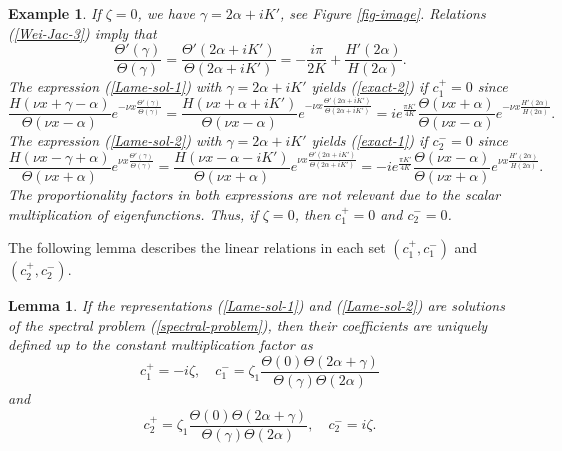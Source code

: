 \documentclass[12pt,reqno]{amsart}
\numberwithin{equation}{section}
\newtheorem{example}{Example}
\newtheorem{lemma}{Lemma}
\begin{document}
\begin{example}
If $\zeta = 0$, we have $\gamma = 2 \alpha + i K'$, see Figure \ref{fig-image}.
Relations (\ref{Wei-Jac-3}) imply that 
$$
\frac{\Theta'(\gamma)}{\Theta(\gamma)} = \frac{\Theta'(2 \alpha + i K')}{\Theta(2 \alpha + i K')} = -\frac{i \pi}{2K} + \frac{H'(2\alpha)}{H(2\alpha)}.
$$
The expression (\ref{Lame-sol-1}) with $\gamma = 2 \alpha + i K'$ yields (\ref{exact-2})  if $c_1^+ = 0$ since 
$$
\frac{H(\nu x + \gamma - \alpha)}{\Theta(\nu x - \alpha)} e^{-\nu x \frac{\Theta'(\gamma)}{\Theta(\gamma)}} = 
\frac{H(\nu x + \alpha + iK')}{\Theta(\nu x - \alpha)} e^{-\nu x \frac{\Theta'(2 \alpha + i K')}{\Theta(2 \alpha + i K')}} = 
i e^{\frac{\pi K'}{4 K}} \frac{\Theta(\nu x + \alpha)}{\Theta(\nu x - \alpha)}
e^{-\nu x \frac{H'(2\alpha)}{H(2\alpha)}}.
$$
The expression (\ref{Lame-sol-2}) with $\gamma = 2 \alpha + i K'$ yields (\ref{exact-1}) if $c_2^- = 0$ since 
$$
\frac{H(\nu x - \gamma + \alpha)}{\Theta(\nu x + \alpha)} e^{\nu x \frac{\Theta'(\gamma)}{\Theta(\gamma)}} = 
\frac{H(\nu x - \alpha - iK')}{\Theta(\nu x + \alpha)} e^{\nu x \frac{\Theta'(2 \alpha + i K')}{\Theta(2 \alpha + i K')}} = 
-i e^{\frac{\pi K'}{4 K}} \frac{\Theta(\nu x - \alpha)}{\Theta(\nu x + \alpha)}
e^{\nu x \frac{H'(2\alpha)}{H(2\alpha)}}.
$$
The proportionality factors in both expressions are not relevant due to the scalar multiplication of eigenfunctions. Thus, if $\zeta = 0$, then $c_1^+ = 0$ and $c_2^- = 0$. 
\label{example-2}
\end{example}

The following lemma describes the linear relations in each set $(c_1^+,c_1^-)$ 
and $(c_2^+,c_2^-)$.

\begin{lemma}
	\label{lem-coefficients}
If the representations (\ref{Lame-sol-1}) and (\ref{Lame-sol-2}) are solutions of the spectral problem (\ref{spectral-problem}), then their coefficients are uniquely defined up to the constant multiplication factor as 
\begin{equation}
\label{coefficient-1}
	c_1^+ = -i \zeta, \quad c_1^- = \zeta_1 \frac{\Theta(0) \Theta(2\alpha + \gamma)}{\Theta(\gamma) \Theta(2\alpha)}
\end{equation}
and
\begin{equation}
\label{coefficient-2}
c_2^+ = \zeta_1 \frac{\Theta(0) \Theta(2\alpha + \gamma)}{\Theta(\gamma) \Theta(2\alpha)}, \quad c_2^- = i \zeta.
\end{equation}
\end{lemma}
\end{document}

